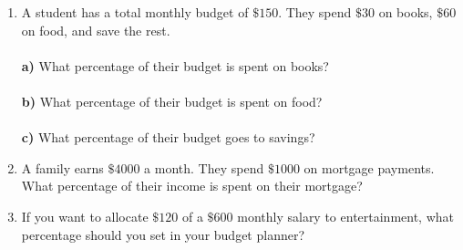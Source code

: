 \documentclass[12pt, letterpaper, fleqn]{article}
\newcommand{\blanklong}{\underline{\hspace{6.5cm}}}
\begin{document}
\begin{enumerate}[itemsep=2.5cm, leftmargin=0.6cm]
\item A student has a total monthly budget of $\$150$. They spend $\$30$ on books, $\$60$ on food, and save the rest. \\ \\
\textbf{a)} What percentage of their budget is spent on books? \blanklong \\ \\

\textbf{b)} What percentage of their budget is spent on food? \blanklong \\ \\

\textbf{c)} What percentage of their budget goes to savings? \blanklong

\item A family earns $\$4000$ a month. They spend $\$1000$ on mortgage payments. What percentage of their income is spent on their mortgage?
\vspace{1cm}

\item If you want to allocate $\$120$ of a $\$600$ monthly salary to entertainment, what percentage should you set in your budget planner?
\end{enumerate}
\end{document}
